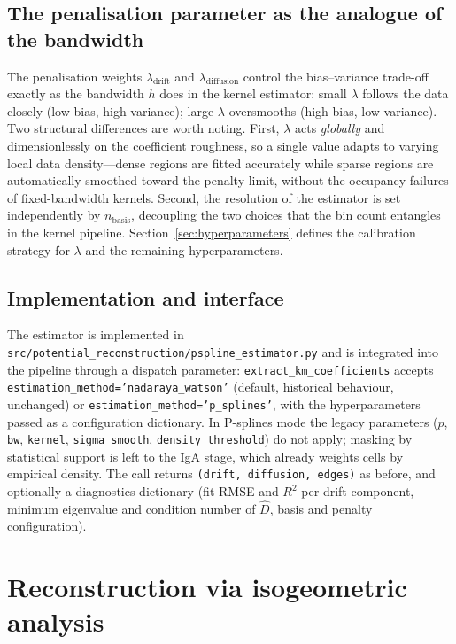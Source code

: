\documentclass[11pt,a4paper]{article}
\begin{document}
\subsection{The penalisation parameter as the analogue of the bandwidth}

The penalisation weights $\lambda_{\mathrm{drift}}$ and
$\lambda_{\mathrm{diffusion}}$ control the bias--variance trade-off exactly as
the bandwidth $h$ does in the kernel estimator: small $\lambda$ follows the
data closely (low bias, high variance); large $\lambda$ oversmooths (high
bias, low variance). Two structural differences are worth noting. First,
$\lambda$ acts \emph{globally} and dimensionlessly on the coefficient
roughness, so a single value adapts to varying local data density---dense
regions are fitted accurately while sparse regions are automatically smoothed
toward the penalty limit, without the occupancy failures of fixed-bandwidth
kernels. Second, the resolution of the estimator is set independently by
$n_{\text{basis}}$, decoupling the two choices that the bin count entangles in
the kernel pipeline. Section~\ref{sec:hyperparameters} defines the calibration
strategy for $\lambda$ and the remaining hyperparameters.

\subsection{Implementation and interface}

The estimator is implemented in
\texttt{src/potential\_reconstruction/pspline\_estimator.py} and is integrated
into the pipeline through a dispatch parameter: \texttt{extract\_km\_coefficients}
accepts \texttt{estimation\_method='nadaraya\_watson'} (default, historical
behaviour, unchanged) or \texttt{estimation\_method='p\_splines'}, with the
hyperparameters passed as a configuration dictionary. In P-splines mode the
legacy parameters ($p$, \texttt{bw}, \texttt{kernel}, \texttt{sigma\_smooth},
\texttt{density\_threshold}) do not apply; masking by statistical support is
left to the IgA stage, which already weights cells by empirical density. The
call returns \texttt{(drift, diffusion, edges)} as before, and optionally a
diagnostics dictionary (fit RMSE and $R^2$ per drift component, minimum
eigenvalue and condition number of $\hat D$, basis and penalty configuration).

\section{Reconstruction via isogeometric analysis}
\end{document}
